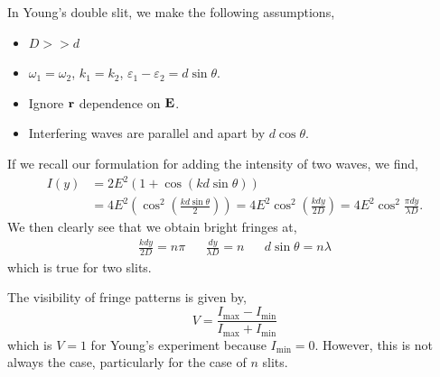 \documentclass{book}
\begin{document}
{\begin{figure}[h]
\begin{subfigure}{0.4\textwidth}
\begin{tikzpicture}
		\end{tikzpicture}
		\caption{}
	\end{subfigure}
	\caption{}
\end{figure}
In Young's double slit, we make the following assumptions,
\begin{itemize}
	\item $D >> d$
	\item $\omega_1 = \omega_2$, $k_1 = k_2$, $\varepsilon_1 - \varepsilon_2 = d\sin\theta$.
	\item Ignore $\vb{r}$ dependence on $\vb{E}$.
	\item Interfering waves are parallel and apart by $d\cos\theta$.
\end{itemize}
If we recall our formulation for adding the intensity of two waves, we find,
\begin{equation}
	\begin{split}
		I(y) & = 2E^2(1+\cos(kd\sin\theta)) \\
		& =  4E^2\left(\cos^2\left(\frac{kd\sin\theta}{2}\right)\right) = 4E^2\cos^2\left(\frac{kdy}{2D}\right) = 4E^2\cos^2\frac{\pi dy}{\lambda D}.
	\end{split}
\end{equation}
We then clearly see that we obtain bright fringes at,
\begin{align}
	\frac{kdy}{2D} = n\pi && \frac{dy}{\lambda D} = n && d\sin\theta = n\lambda
\end{align}
which is true for two slits.
\begin{tcolorbox}[title={Visbility of fringe patterns}, width=\textwidth]
	The visibility of fringe patterns is given by,
	\begin{equation}
		V = \frac{I_{\text{max}} - I_{\text{min}}}{I_{\text{max}} + I_{\text{min}}}
	\end{equation}
	which is $V = 1$ for Young's experiment because $I_{\text{min}} = 0$. However, this is not always the case, particularly for the case of $n$ slits.
\end{tcolorbox}
}
\end{document}
